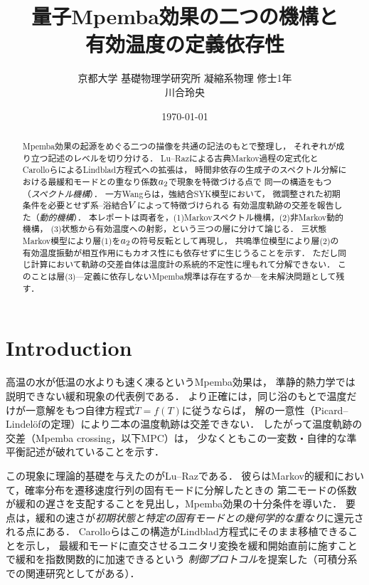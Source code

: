 \documentclass[a4paper,11pt,onecolumn,baselineskip=14.5pt]{jlreq}
\title{量子Mpemba効果の二つの機構と\\有効温度の定義依存性}
\author{京都大学 基礎物理学研究所 凝縮系物理 修士1年\\川合玲央}
\date{\today}
\begin{document}
\maketitle

\begin{abstract}
Mpemba効果の起源をめぐる二つの描像を共通の記法のもとで整理し，
それぞれが成り立つ記述のレベルを切り分ける．
Lu--Raz\cite{Lu2017}による古典Markov過程の定式化と
Carolloら\cite{Carollo2021}によるLindblad方程式への拡張は，
時間非依存の生成子のスペクトル分解における最緩和モードとの重なり係数$a_{2}$で現象を特徴づける点で
同一の構造をもつ（\emph{スペクトル機構}）．
一方Wangら\cite{Wang2024}は，強結合SYK模型において，
微調整された初期条件を必要とせず系--浴結合$V$によって特徴づけられる
有効温度軌跡の交差を報告した（\emph{動的機構}）．
本レポートは両者を，(1)Markovスペクトル機構，(2)非Markov動的機構，
(3)状態から有効温度への射影，という三つの層に分けて論じる．
三状態Markov模型により層(1)を$a_{2}$の符号反転として再現し，
共鳴準位模型により層(2)の有効温度振動が相互作用にもカオス性にも依存せずに生じうることを示す．
ただし同じ計算において軌跡の交差自体は温度計の系統的不定性に埋もれて分解できない．
このことは層(3)---定義に依存しないMpemba規準は存在するか---を未解決問題として残す．
\end{abstract}

\section{Introduction}
\label{sec:intro}

高温の水が低温の水よりも速く凍るというMpemba効果\cite{Mpemba1969}は，
準静的熱力学では説明できない緩和現象の代表例である．
より正確には，同じ浴のもとで温度だけが一意解をもつ自律方程式$\dot{T}=f(T)$に従うならば，
解の一意性（Picard--Lindel\"ofの定理）により二本の温度軌跡は交差できない．
したがって温度軌跡の交差（Mpemba crossing，以下MPC）は，
少なくともこの一変数・自律的な準平衡記述が破れていることを示す\cite{Lu2017}．

この現象に理論的基礎を与えたのがLu--Raz\cite{Lu2017}である．
彼らはMarkov的緩和において，確率分布を遷移速度行列の固有モードに分解したときの
第二モードの係数%
が緩和の遅さを支配することを見出し，Mpemba効果の十分条件を導いた．
要点は，緩和の速さが\emph{初期状態と特定の固有モードとの幾何学的な重なり}に還元される点にある．
Carolloら\cite{Carollo2021}はこの構造がLindblad方程式にそのまま移植できることを示し，
最緩和モードに直交させるユニタリ変換を緩和開始直前に施すことで緩和を指数関数的に加速できるという
\emph{制御プロトコル}を提案した（可積分系での関連研究として\cite{Ares2023,Rylands2024}がある）．
\end{document}
